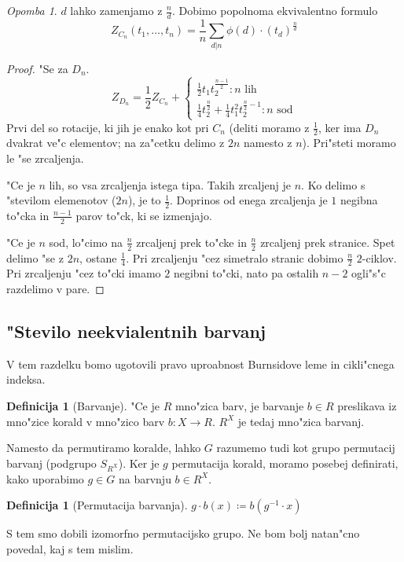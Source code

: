 \documentclass[a4paper,12pt]{article}
\theoremstyle{definition}
\newtheorem{defn}[counter]{Definicija}
\theoremstyle{remark}
\newtheorem*{rem}{Opomba}
\begin{document}
\begin{rem}
	$d$ lahko zamenjamo z $\frac{n}{d}$. Dobimo popolnoma ekvivalentno formulo
	\[Z_{C_n}(t_1, \ldots, t_n) = \frac{1}{n}\sum_{d|n}\phi(d) \cdot (t_d)^\frac{n}{d}\]
\end{rem}
\begin{proof}"Se za $D_n$.
	\[
	Z_{D_n} = \frac{1}{2}Z_{C_n} +
	\begin{cases}
		\frac{1}{2} t_1 t_2^{\frac{n-1}{2}}: n \text{ lih}
		\\
		\frac{1}{4} t_2^{\frac{n}{2}} + \frac{1}{4} t_1^2 t_2^{\frac{n}{2}-1}: n \text{ sod}
	\end{cases}
	\]
	Prvi del so rotacije, ki jih je enako kot pri $C_n$ (deliti moramo z $\frac{1}{2}$, ker ima $D_n$ dvakrat ve"c elementov; na za"cetku delimo z $2n$ namesto z $n$). Pri"steti moramo le "se zrcaljenja. 
	
	"Ce je $n$ lih, so vsa zrcaljenja istega tipa. Takih zrcaljenj je $n$. Ko delimo s "stevilom elemenotov ($2n$), je to $\frac{1}{2}$. Doprinos od enega zrcaljenja je $1$ negibna to"cka in $\frac{n-1}{2}$ parov to"ck, ki se izmenjajo.
	
	"Ce je $n$ sod, lo"cimo na $\frac{n}{2}$ zrcaljenj prek to"cke in $\frac{n}{2}$ zrcaljenj prek stranice. Spet delimo "se z $2n$, ostane $\frac{1}{4}$. Pri zrcaljenju "cez simetralo stranic dobimo $\frac{n}{2}$ $2$-ciklov. Pri zrcaljenju "cez to"cki imamo $2$ negibni to"cki, nato pa ostalih $n-2$ ogli"s"c razdelimo v pare.
\end{proof}


\subsection{"Stevilo neekvialentnih barvanj}
V tem razdelku bomo ugotovili pravo uproabnost Burnsidove leme in cikli"cnega indeksa.
\begin{defn}[Barvanje]
	"Ce je $R$ mno"zica barv, je barvanje $b \in R$ preslikava iz mno"zice korald v mno"zico barv
	$b : X \to R$.
	$R^X$ je tedaj mno"zica barvanj.
\end{defn}

Namesto da permutiramo koralde, lahko $G$ razumemo tudi kot grupo permutacij barvanj (podgrupo $S_{R^X}$). Ker je $g$ permutacija korald, moramo posebej definirati, kako uporabimo $g \in G$ na barvnju $b \in R^X$.
\begin{defn}[Permutacija barvanja]
	$g \cdot b(x) \coloneqq b (g^{-1} \cdot x)$
\end{defn}
S tem smo dobili izomorfno permutacijsko grupo. Ne bom bolj natan"cno povedal, kaj s tem mislim.
\end{document}
